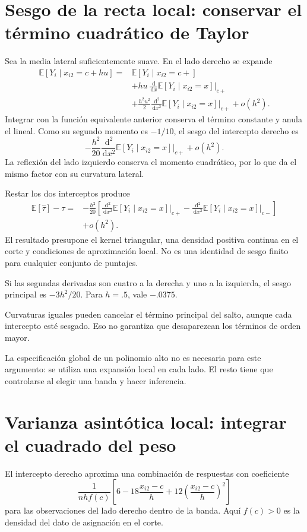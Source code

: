 \documentclass[11pt,a4paper]{article}
\newcommand{\E}{\mathbb E}
\newcommand{\dd}{\,\mathrm d}
\begin{document}
\clearpage
\section{Sesgo de la recta local: conservar el término cuadrático de Taylor}\label{unidad33}
Sea la media lateral suficientemente suave.
En el lado derecho se expande
\[
\begin{aligned}
\E[Y_i\mid x_{i2}=c+hu]
={}&\E[Y_i\mid x_{i2}=c+]\\
&+hu\,\frac{\dd}{\dd x}\E[Y_i\mid x_{i2}=x]\bigg|_{c+}\\
&+\frac{h^2u^2}{2}
\frac{\dd^2}{\dd x^2}\E[Y_i\mid x_{i2}=x]\bigg|_{c+}
+o(h^2).
\end{aligned}
\]
Integrar con la función equivalente anterior
conserva el término constante y anula el lineal.
Como su segundo momento es \(-1/10\),
el sesgo del intercepto derecho es
\[
-\frac{h^2}{20}
\frac{\dd^2}{\dd x^2}\E[Y_i\mid x_{i2}=x]\bigg|_{c+}
+o(h^2).
\]
La reflexión del lado izquierdo conserva
el momento cuadrático, por lo que da
el mismo factor con su curvatura lateral.

Restar los dos interceptos produce
\[
\begin{aligned}
\E[\widehat\tau]-\tau
={}&-\frac{h^2}{20}\left[
\frac{\dd^2}{\dd x^2}\E[Y_i\mid x_{i2}=x]\bigg|_{c+}
-\frac{\dd^2}{\dd x^2}\E[Y_i\mid x_{i2}=x]\bigg|_{c-}
\right]\\
&+o(h^2).
\end{aligned}
\]
El resultado presupone el kernel triangular,
una densidad positiva continua en el corte
y condiciones de aproximación local.
No es una identidad de sesgo finito
para cualquier conjunto de puntajes.

\begin{ejemplo}
Si las segundas derivadas son cuatro
a la derecha y uno a la izquierda,
el sesgo principal es \(-3h^2/20\).
Para \(h=.5\), vale \(-.0375\).
\end{ejemplo}
Curvaturas iguales pueden cancelar el
término principal del salto,
aunque cada intercepto esté sesgado.
Eso no garantiza que desaparezcan
los términos de orden mayor.

La especificación global de un polinomio
alto no es necesaria para este argumento:
se utiliza una expansión local en cada lado.
El resto tiene que controlarse
al elegir una banda y hacer inferencia.

\clearpage
\section{Varianza asintótica local: integrar el cuadrado del peso}\label{unidad34}
El intercepto derecho aproxima una combinación
de respuestas con coeficiente
\[
\frac{1}{nh f(c)}
\left[6-18\frac{x_{i2}-c}{h}
+12\left(\frac{x_{i2}-c}{h}\right)^2\right]
\]
para las observaciones del lado derecho
dentro de la banda.
Aquí \(f(c)>0\) es la densidad
del dato de asignación en el corte.
\end{document}
